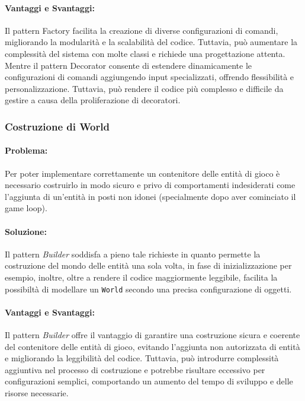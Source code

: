 \documentclass[a4paper,12pt]{report}
\begin{document}
	\paragraph{Vantaggi e Svantaggi:}
	Il pattern Factory facilita la creazione di diverse configurazioni di comandi, migliorando la modularità e la scalabilità del codice. Tuttavia, può aumentare la complessità del sistema con molte classi e richiede una progettazione attenta.
	Mentre il pattern Decorator consente di estendere dinamicamente le configurazioni di comandi aggiungendo input specializzati, offrendo flessibilità e personalizzazione. Tuttavia, può rendere il codice più complesso e difficile da gestire a causa della proliferazione di decoratori.
	
	\subsubsection{Costruzione di World}
	
	\paragraph{Problema:} Per poter implementare correttamente un contenitore delle entità di gioco è necessario costruirlo in modo sicuro e privo di comportamenti indesiderati come l'aggiunta di un'entità in posti non idonei (specialmente dopo aver cominciato il game loop).
	
	\paragraph{Soluzione:} Il pattern \textit{Builder} soddisfa a pieno tale richieste in quanto permette la costruzione del mondo delle entità una sola volta, in fase di inizializzazione per esempio, inoltre, oltre a rendere il codice maggiormente leggibile, facilita la possibiltà di modellare un      \texttt{World} secondo una precisa configurazione di oggetti.
	
	\paragraph{Vantaggi e Svantaggi:}
	Il pattern \textit{Builder} offre il vantaggio di garantire una costruzione sicura e coerente del contenitore delle entità di gioco, evitando l'aggiunta non autorizzata di entità e migliorando la leggibilità del codice. Tuttavia, può introdurre complessità aggiuntiva nel processo di costruzione e potrebbe risultare eccessivo per configurazioni semplici, comportando un aumento del tempo di sviluppo e delle risorse necessarie.
	
\end{document}
